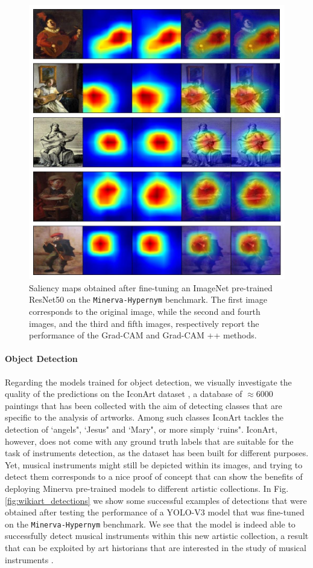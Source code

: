 \begin{figure}[ht!]
\centering
  \includegraphics[width=\linewidth]{./Images/Chapter05/grad_cams}
  \caption{Saliency maps obtained after fine-tuning an ImageNet pre-trained ResNet50 on the \texttt{Minerva-Hypernym} benchmark. The first image corresponds to the original image, while the second and fourth images, and the third and fifth images, respectively report the performance of the Grad-CAM and Grad-CAM ++ methods.}
  \label{fig:grad_cams}
\end{figure}


\paragraph{Object Detection}
Regarding the models trained for object detection, we visually investigate the quality of the predictions on the IconArt dataset \cite{gonthier2018weakly}, a database of $\approx 6000$ paintings that has been collected with the aim of detecting classes that are specific to the analysis of artworks. Among such classes IconArt tackles the detection of `angels", `Jesus" and `Mary", or more simply `ruins". IconArt, however, does not come with any ground truth labels that are suitable for the task of instruments detection, as the dataset has been built for different purposes. Yet, musical instruments might still be depicted within its images, and trying to detect them corresponds to a nice proof of concept that can show the benefits of deploying Minerva pre-trained models to different artistic collections. In Fig. \ref{fig:wikiart_detections} we show some successful examples of detections that were obtained after testing the performance of a YOLO-V3 model that was fine-tuned on the \texttt{Minerva-Hypernym} benchmark. We see that the model is indeed able to successfully detect musical instruments within this new artistic collection, a result that can be exploited by art historians that are interested in the study of musical instruments .   

